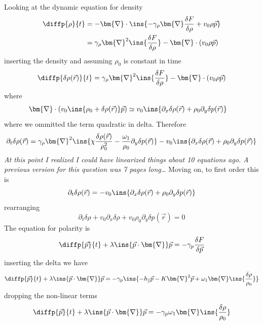 Looking at the dynamic equation for density
\begin{align}
	\diffp{\rho}{t} &= - \bm{\nabla} \cdot\ins{-\gamma_\rho \bm{\nabla} \frac{\delta F}{\delta\rho}+v_0\rho\vec{p}}\\
	&= \gamma_\rho\bm{\nabla}^2\ins{\frac{\delta F}{\delta\rho}}-\bm{\nabla}\cdot(v_0\rho\vec{p})
\end{align}
inserting the density and assuming \(\rho_0\) is constant in time
\begin{equation}
	\diffp{\delta\rho(\vec{r})}{t} = \gamma_\rho\bm{\nabla}^2\ins{\frac{\delta F}{\delta\rho}}-\bm{\nabla}\cdot(v_0\rho\vec{p})
\end{equation}
where
\begin{align}
	\bm{\nabla}\cdot(v_0\ins{\rho_0+\delta\rho(\vec{r})}\vec{p}) &\simeq v_0\ins{\partial_x\delta\rho(\vec{r})+\rho_0\partial_y\delta p(\vec{r})}
\end{align}
where we ommitted the term quadratic in delta. Therefore
\begin{equation}
	\partial_t\delta\rho(\vec{r}) = \gamma_\rho\bm{\nabla}^2\ins{\chi\frac{\delta\rho(\vec{r})}{\rho_0^2} - \frac{\omega_1}{\rho_0}\partial_y\delta p(\vec{r})} - v_0\ins{\partial_x\delta\rho(\vec{r})+\rho_0\partial_y\delta p(\vec{r})}
\end{equation}
\emph{At this point I realized I could have linearized things about 10 equations ago. A previous version for this question was 7 pages long\dots} Moving on, to first order this is
\begin{equation}
	\partial_t\delta\rho(\vec{r}) = - v_0\ins{\partial_x\delta\rho(\vec{r})+\rho_0\partial_y\delta p(\vec{r})}
\end{equation}
rearranging
\begin{equation}
	\partial_t\delta \rho+v_0\partial_x\delta \rho+v_0\rho_0\partial_y\delta p(\vec{r})=0
\end{equation}
The equation for polarity is
\begin{equation}
	\diffp{\vec{p}}{t}+\lambda\ins{\vec{p}\cdot\bm{\nabla}}\vec{p} = -\gamma_p\frac{\delta F}{\delta \vec{p}}
\end{equation}
inserting the delta we have
\begin{equation}
	\diffp{\vec{p}}{t}+\lambda\ins{\vec{p}\cdot\bm{\nabla}}\vec{p} = -\gamma_p\ins{-h_\parallel \vec{p} - K\bm{\nabla}^2 \vec{p} + \omega_1\bm{\nabla}\ins{\frac{\delta\rho}{\rho_0}}}
\end{equation}
dropping the non-linear terms
\begin{equation}
	\diffp{\vec{p}}{t}+\lambda\ins{\vec{p}\cdot\bm{\nabla}}\vec{p} = -\gamma_p\omega_1\bm{\nabla}\ins{\frac{\delta\rho}{\rho_0}}
\end{equation}
